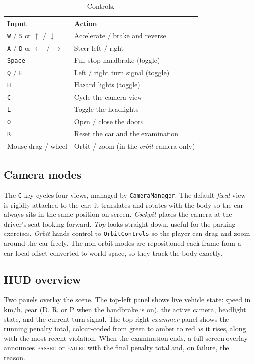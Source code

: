 \documentclass[11pt]{article}
\newcommand{\code}[1]{\texttt{#1}}
\begin{document}
\begin{table}[h]
  \centering
  \caption{Controls.}
  \label{tab:controls}
  \begin{tabular}{ll}
    \toprule
    Input & Action \\
    \midrule
    \texttt{W} / \texttt{S} or $\uparrow$ / $\downarrow$ & Accelerate / brake and reverse \\
    \texttt{A} / \texttt{D} or $\leftarrow$ / $\rightarrow$ & Steer left / right \\
    \texttt{Space} & Full-stop handbrake (toggle) \\
    \texttt{Q} / \texttt{E} & Left / right turn signal (toggle) \\
    \texttt{H} & Hazard lights (toggle) \\
    \texttt{C} & Cycle the camera view \\
    \texttt{L} & Toggle the headlights \\
    \texttt{O} & Open / close the doors \\
    \texttt{R} & Reset the car and the examination \\
    Mouse drag / wheel & Orbit / zoom (in the \emph{orbit} camera only) \\
    \bottomrule
  \end{tabular}
\end{table}

\subsection{Camera modes}

The \texttt{C} key cycles four views, managed by \code{CameraManager}. The
default \emph{fixed} view is rigidly attached to the car: it translates and
rotates with the body so the car always sits in the same position on screen.
\emph{Cockpit} places the camera at the driver's seat looking forward. \emph{Top}
looks straight down, useful for the parking exercises. \emph{Orbit} hands control
to \code{OrbitControls} so the player can drag and zoom around the car freely.
The non-orbit modes are repositioned each frame from a car-local offset converted
to world space, so they track the body exactly.

\subsection{HUD overview}

Two panels overlay the scene. The top-left panel shows live vehicle state: speed
in km/h, gear (D, R, or P when the handbrake is on), the active camera, headlight
state, and the current turn signal. The top-right \emph{examiner} panel shows the
running penalty total, colour-coded from green to amber to red as it rises, along
with the most recent violation. When the examination ends, a full-screen overlay
announces \textsc{passed} or \textsc{failed} with the final penalty total and, on
failure, the reason.
\end{document}
